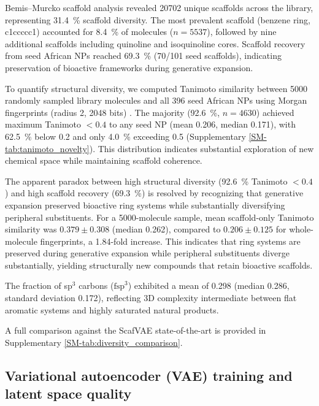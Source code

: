 \documentclass[journal=jcisd8,manuscript=article]{achemso}
\begin{document}
Bemis--Murcko scaffold analysis revealed \num{20702} unique scaffolds across the library, representing \qty{31.4}{\percent} scaffold diversity. The most
prevalent scaffold (benzene ring, c1ccccc1) accounted for \qty{8.4}{\percent} of molecules ($n = \num{5537}$), followed by nine additional scaffolds including
quinoline and isoquinoline cores. Scaffold recovery from seed African NPs reached \qty{69.3}{\percent} (\num{70}/\num{101} seed scaffolds), indicating
preservation of bioactive frameworks during generative expansion.

To quantify structural diversity, we computed Tanimoto similarity between \num{5000} randomly sampled library molecules and all \num{396} seed African NPs
using Morgan fingerprints (radius \num{2}, \num{2048} bits) \cite{Rogers2010, Morgan1965}. The majority (\qty{92.6}{\percent}, $n = \num{4630}$) achieved
maximum Tanimoto $< \num{0.4}$ to any seed NP (mean \num{0.206}, median \num{0.171}), with \qty{62.5}{\percent} below \num{0.2} and only \qty{4.0}{\percent}
exceeding \num{0.5} (Supplementary \cref{SM-tab:tanimoto_novelty}). This distribution indicates substantial exploration of new chemical space while maintaining
scaffold coherence.

The apparent paradox between high structural diversity (\qty{92.6}{\percent} Tanimoto $< \num{0.4}$) and high scaffold recovery (\qty{69.3}{\percent}) is
resolved by recognizing that generative expansion preserved bioactive ring systems while substantially diversifying peripheral substituents. For a
\num{5000}-molecule sample, mean scaffold-only Tanimoto similarity was $\num{0.379} \pm \num{0.308}$ (median \num{0.262}), compared to $\num{0.206} \pm
\num{0.125}$ for whole-molecule fingerprints, a \num{1.84}-fold increase. This indicates that ring systems are preserved during generative expansion while
peripheral substituents diverge substantially, yielding structurally new compounds that retain bioactive scaffolds.

The fraction of sp$^3$ carbons ($\text{fsp}^3$) exhibited a mean of \num{0.298} (median \num{0.286}, standard deviation \num{0.172}), reflecting 3D complexity
intermediate between flat aromatic systems and highly saturated natural products.

A full comparison against the ScafVAE state-of-the-art is provided in Supplementary \cref{SM-tab:diversity_comparison}.

\subsection{Variational autoencoder (VAE) training and latent space quality}
\label{sec:vae_training}
\end{document}
